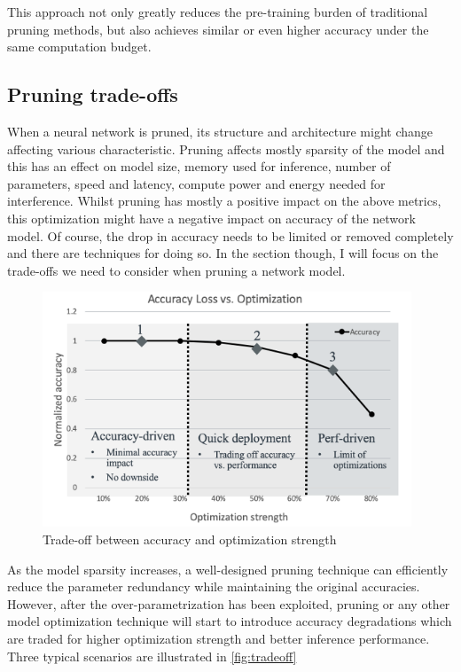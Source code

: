 This approach not only greatly reduces the pre-training burden of traditional
pruning methods, but also achieves similar or even higher accuracy under the
same computation budget.~\cite{Wang_2020}

\subsection{Pruning trade-offs}\label{subsec:tradeoff}
When a neural network is pruned, its structure and architecture might change
affecting various characteristic. Pruning affects mostly sparsity of the model
and this has an effect on model size, memory used for inference, number of
parameters, speed and latency, compute power and energy needed for
interference.
Whilst pruning has mostly a positive impact on the above metrics, this
optimization might have a negative impact on accuracy of the network model. Of
course, the drop in accuracy needs to be limited or removed completely and
there are techniques for doing so.
In the section though, I will focus on the trade-offs we need to consider
when pruning a network model.

\begin{figure}[ht]
    \includegraphics[width=11cm]{images/pruning/tradeoff.png}
    \centering
    \caption{Trade-off between accuracy and optimization strength}\label{fig:tradeoff}
\end{figure}

As the model sparsity increases, a well-designed pruning technique can
efficiently reduce the parameter redundancy while maintaining the original
accuracies. However, after the over-parametrization has been exploited, pruning
or any other model optimization technique will start to introduce accuracy
degradations which are traded for higher optimization strength and better
inference performance. Three typical scenarios are illustrated in \autoref{fig:tradeoff}

